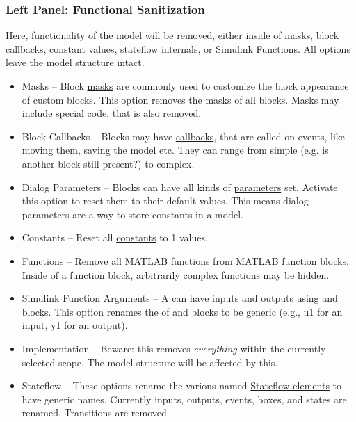 \documentclass{article}
\begin{document}
\subsubsection{Left Panel: Functional Sanitization}
\label{lbl:leftside}
Here, functionality of the model will be removed, either inside of masks, block callbacks, constant values, stateflow internals, or Simulink Functions. All options leave the model structure intact.
\begin{itemize}
	\item Masks -- Block \href{https://www.mathworks.com/help/simulink/ug/block-masks.html}{masks} are commonly used to customize the block appearance of custom blocks. This option removes the masks of all blocks. Masks may include special code, that is also removed.
	\item Block Callbacks -- Blocks may have \href{https://www.mathworks.com/help/simulink/ug/block-callbacks.html}{callbacks}, that are called on events, like moving them, saving the model etc. They can range from simple (e.g. is another block still present?) to complex.
	\item Dialog Parameters -- Blocks can have all kinds of \href{https://www.mathworks.com/help/simulink/slref/block-specific-parameters.html}{parameters} set. Activate this option to reset them to their default values. This means dialog parameters are a way to store constants in a model.
	\item Constants -- Reset all \href{https://www.mathworks.com/help/simulink/slref/constant.html}{constants} to 1 values.
	\item Functions -- Remove all MATLAB functions from \href{https://www.mathworks.com/help/simulink/ug/what-is-a-matlab-function-block.html}{MATLAB function blocks}. Inside of a function block, arbitrarily complex functions may be hidden.
	\item Simulink Function Arguments -- A \simfunc can have inputs and outputs using \argin and \argout blocks. This option renames the  of \argin and \argout blocks to be generic (e.g., u1 for an input, y1 for an output).
	\item Implementation -- Beware: this removes \textit{everything} within the currently selected scope. The model structure will be affected by this.
	
	\item Stateflow -- These options rename the various named \href{https://www.mathworks.com/help/stateflow/ug/overview-of-stateflow-objects.html}{Stateflow elements} to have generic names. Currently inputs, outputs, events, boxes, and states are renamed. Transitions are removed.
\end{itemize}
\end{document}
